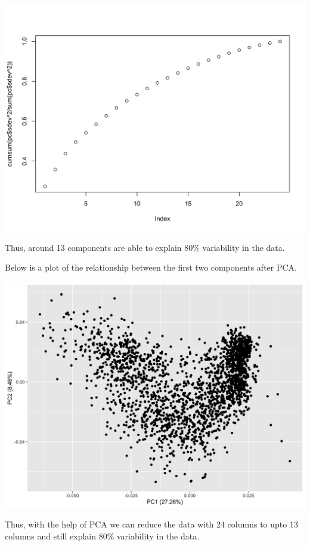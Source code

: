 \documentclass[
  a4paperpaper,
  DIV=11,
  numbers=noendperiod]{scrartcl}
\begin{document}
\includegraphics{Report_files/figure-pdf/unnamed-chunk-16-1.png}

Thus, around 13 components are able to explain 80\% variability in the
data.

Below is a plot of the relationship between the first two components
after PCA.

\includegraphics{Report_files/figure-pdf/unnamed-chunk-17-1.png}

Thus, with the help of PCA we can reduce the data with 24 columns to
upto 13 columns and still explain 80\% variability in the data.
\end{document}
